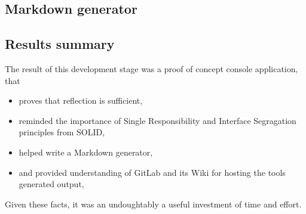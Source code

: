 \subsection{Markdown generator}

\subsection{Results summary}

The result of this development stage was a proof of concept console application, that
\begin{itemize}
    \item proves that reflection is sufficient,
    \item reminded the importance of Single Responsibility and Interface Segragation principles from SOLID,
    \item helped write a Markdown generator,
    \item and provided understanding of GitLab and its Wiki for hosting the tools generated output,
\end{itemize}

Given these facts, it was an undoughtably a useful investment of time and effort.